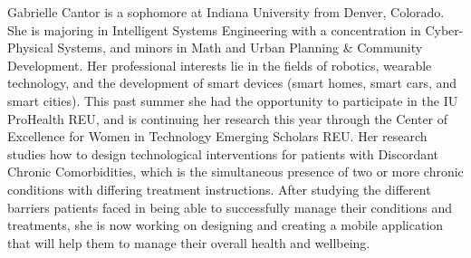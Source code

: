 Gabrielle Cantor is a sophomore at Indiana University from Denver, Colorado. She is majoring in Intelligent Systems Engineering with a concentration in Cyber-Physical Systems, and minors in Math and Urban Planning & Community Development. Her professional interests lie in  the fields of robotics, wearable technology, and the development of smart devices (smart homes, smart cars, and smart cities). This past summer she had the opportunity to participate in the IU ProHealth REU, and is continuing her research this year through the Center of Excellence for Women in Technology Emerging Scholars REU. Her research studies how to design technological interventions for patients with Discordant Chronic Comorbidities, which is the simultaneous presence of two or more chronic conditions with differing treatment instructions. After studying the different barriers patients faced in being able to successfully manage their conditions and treatments, she is now working on designing and creating a mobile application that will help them to manage their overall health and wellbeing. 
